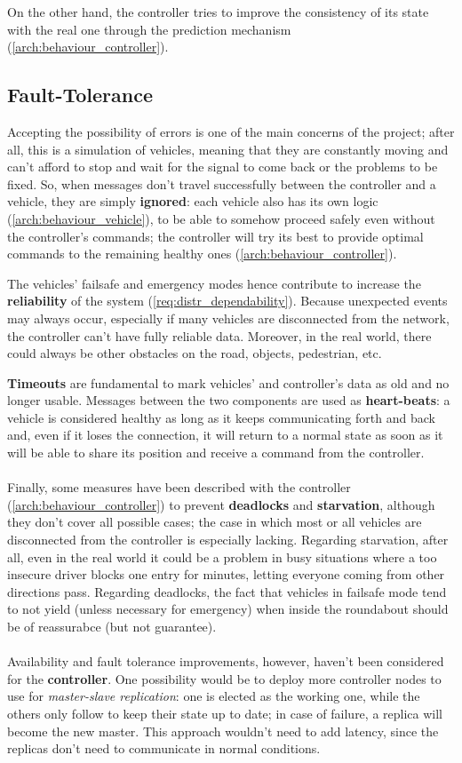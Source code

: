 On the other hand, the controller tries to improve the consistency of its state
with the real one through the prediction mechanism
(\ref{arch:behaviour_controller}).

\subsection{Fault-Tolerance}\label{arch:fault}
Accepting the possibility of errors is one of the main concerns of the project;
after all, this is a simulation of vehicles, meaning that they are constantly
moving and can't afford to stop and wait for the signal to come back or the
problems to be fixed. So, when messages don't travel successfully between the
controller and a vehicle, they are simply \textbf{ignored}: each vehicle also
has its own logic (\ref{arch:behaviour_vehicle}), to be able to somehow proceed
safely even without the controller's commands; the controller will try its best
to provide optimal commands to the remaining healthy ones
(\ref{arch:behaviour_controller}).

The vehicles' failsafe and emergency modes hence contribute to increase the
\textbf{reliability} of the system (\ref{req:distr_dependability}). Because
unexpected events may always occur, especially if many vehicles are disconnected
from the network, the controller can't have fully reliable data. Moreover, in
the real world, there could always be other obstacles on the road, objects,
pedestrian, etc.

\textbf{Timeouts} are fundamental to mark vehicles' and controller's data as old
and no longer usable. Messages between the two components are used as
\textbf{heart-beats}: a vehicle is considered healthy as long as it keeps
communicating forth and back and, even if it loses the connection, it will
return to a normal state as soon as it will be able to share its position and
receive a command from the controller.
\\
\\
Finally, some measures have been described with the controller
(\ref{arch:behaviour_controller}) to prevent \textbf{deadlocks} and
\textbf{starvation}, although they don't cover all possible cases; the case in
which most or all vehicles are disconnected from the controller is especially
lacking. Regarding starvation, after all, even in the real world it could be a
problem in busy situations where a too insecure driver blocks one entry for
minutes, letting everyone coming from other directions pass. Regarding
deadlocks, the fact that vehicles in failsafe mode tend to not yield (unless
necessary for emergency) when inside the roundabout should be of reassurabce
(but not guarantee).
\\
\\
Availability and fault tolerance improvements, however, haven't been considered
for the \textbf{controller}. One possibility would be to deploy more controller
nodes to use for \textit{master-slave replication}: one is elected as the
working one, while the others only follow to keep their state up to date; in
case of failure, a replica will become the new master. This approach wouldn't
need to add latency, since the replicas don't need to communicate in normal
conditions.

